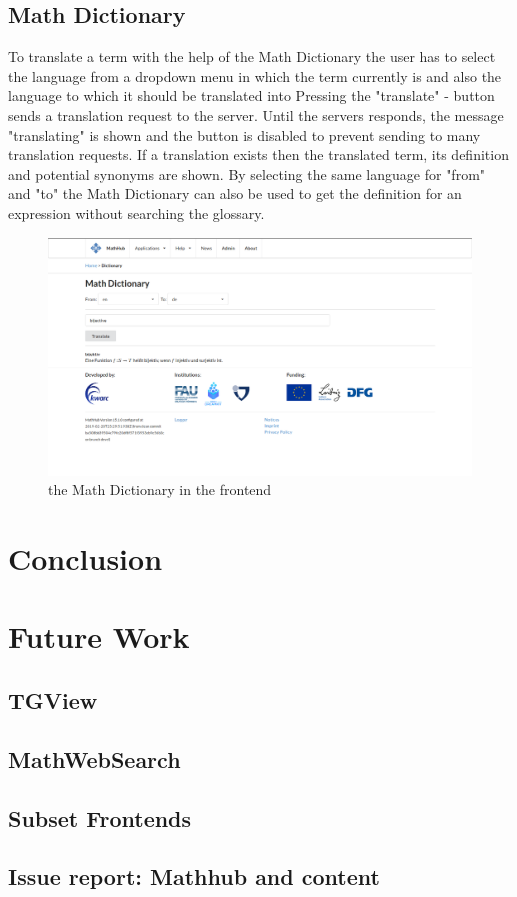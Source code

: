 \documentclass[11pt,a4paper]{article}
\begin{document}
\subsection{Math Dictionary}
To translate a term with the help of the Math Dictionary the user has to select the language from a dropdown menu in which the term currently is and also the language to which it should be translated into
Pressing the "translate" - button sends a translation request to the server.
Until the servers responds, the message "translating" is shown and the button is disabled to prevent sending to many translation requests.
If a translation exists then the translated term, its definition and potential synonyms are shown.
By selecting the same language for "from" and "to" the Math Dictionary can also be used to get the definition for an expression without searching the glossary.
\begin{figure}[H]
\includegraphics[width=1\textwidth]{dictionary.png}
\caption{the Math Dictionary in the frontend}
\end{figure}

\section{Conclusion}

\section{Future Work}
	\subsection{TGView}
	\subsection{MathWebSearch}
	\subsection{Subset Frontends}
	\subsection{Issue report: Mathhub and content}

\printbibliography
{}
\end{document}
